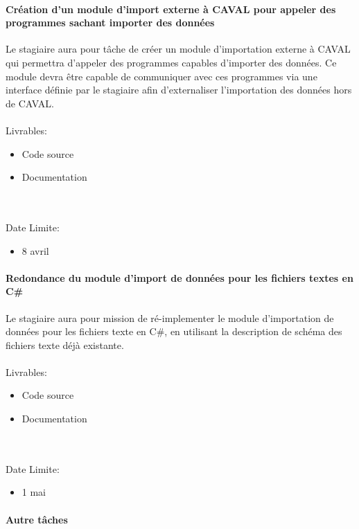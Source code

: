 \documentclass[init,francais]{rapportPFE}  %
\begin{document}
\paragraph*{Création d'un module d'import externe à CAVAL pour appeler des programmes sachant importer des données}


Le stagiaire aura pour tâche de créer un module d'importation externe à CAVAL qui permettra d'appeler des programmes
capables d'importer des données. Ce module devra être capable de communiquer avec ces programmes via une interface définie par le stagiaire afin d'externaliser l'importation des données hors de CAVAL.
\\~\\
Livrables:
\begin{itemize}
  \item Code source
  \item Documentation
\end{itemize}\\~\\
Date Limite:
\begin{itemize}
  \item 8 avril
\end{itemize}

\paragraph*{Redondance du module d'import de données pour les fichiers textes en C#}


Le stagiaire aura pour mission de ré-implementer le module d'importation de données pour les fichiers texte en C#, en utilisant la description de schéma des fichiers texte déjà existante.
\\~\\
Livrables:
\begin{itemize}
  \item Code source
  \item Documentation
\end{itemize}\\~\\
Date Limite:
\begin{itemize}
  \item 1 mai
\end{itemize}


\paragraph*{Autre tâches}
\end{document}
